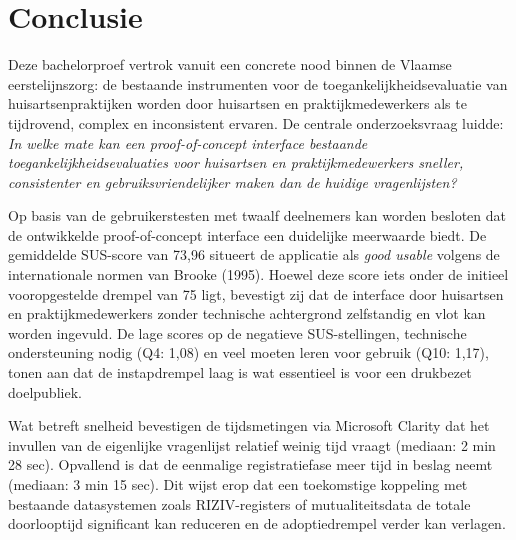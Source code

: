 
\chapter{Conclusie}%
\label{ch:conclusie}


Deze bachelorproef vertrok vanuit een concrete nood binnen de Vlaamse eerstelijnszorg: 
de bestaande instrumenten voor de toegankelijkheidsevaluatie van huisartsenpraktijken worden door huisartsen en praktijkmedewerkers als te tijdrovend, complex en inconsistent ervaren. 
De centrale onderzoeksvraag luidde: \textit{In welke mate kan een proof-of-concept interface bestaande toegankelijkheidsevaluaties voor huisartsen en praktijkmedewerkers sneller, consistenter en gebruiksvriendelijker maken dan de huidige vragenlijsten?}
\medskip

Op basis van de gebruikerstesten met twaalf deelnemers kan worden besloten dat de ontwikkelde proof-of-concept interface een duidelijke meerwaarde biedt. 
De gemiddelde SUS-score van 73,96 situeert de applicatie als \textit{good usable} volgens de internationale normen van Brooke (1995). 
Hoewel deze score iets onder de initieel vooropgestelde drempel van 75 ligt, bevestigt zij dat de interface door huisartsen en praktijkmedewerkers zonder technische achtergrond zelfstandig en vlot kan worden ingevuld. 
De lage scores op de negatieve SUS-stellingen, technische ondersteuning nodig (Q4: 1,08) en veel moeten leren voor gebruik (Q10: 1,17), tonen aan dat de instapdrempel laag is wat essentieel is voor een drukbezet doelpubliek.
\medskip

Wat betreft snelheid bevestigen de tijdsmetingen via Microsoft Clarity dat het invullen van de eigenlijke vragenlijst relatief weinig tijd vraagt (mediaan: 2 min 28 sec). 
Opvallend is dat de eenmalige registratiefase meer tijd in beslag neemt (mediaan: 3 min 15 sec). 
Dit wijst erop dat een toekomstige koppeling met bestaande datasystemen zoals RIZIV-registers of mutualiteitsdata de totale doorlooptijd significant kan reduceren en de adoptiedrempel verder kan verlagen.
\medskip

